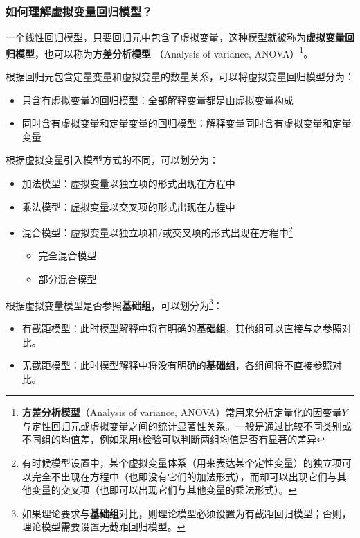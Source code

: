 \documentclass[12pt,(landscape,a4paper),(portrait,a4paper)]{article}
\providecommand{\tightlist}{%
  \setlength{\itemsep}{0pt}\setlength{\parskip}{0pt}}
\let\rmarkdownfootnote\footnote%
\def\footnote{\protect\rmarkdownfootnote}
\theoremstyle{definition}
\theoremstyle{definition}
\theoremstyle{definition}
\theoremstyle{remark}
\begin{document}
\subsubsection{如何理解虚拟变量回归模型？}

一个线性回归模型，只要回归元中包含了虚拟变量，这种模型就被称为\textbf{虚拟变量回归模型}，也可以称为\textbf{方差分析模型}
（Analysis of variance, ANOVA）\footnote{\textbf{方差分析模型}（Analysis
  of variance,
  ANOVA）常用来分析定量化的因变量\(Y\)与定性回归元或虚拟变量之间的统计显著性关系。一般是通过比较不同类别或不同组的均值差，例如采用t检验可以判断两组均值是否有显著的差异}。

根据回归元包含定量变量和虚拟变量的数量关系，可以将虚拟变量回归模型分为：

\begin{itemize}
\tightlist
\item
  只含有虚拟变量的回归模型：全部解释变量都是由虚拟变量构成
\item
  同时含有虚拟变量和定量变量的回归模型：解释变量同时含有虚拟变量和定量变量
\end{itemize}

根据虚拟变量引入模型方式的不同，可以划分为：

\begin{itemize}
\tightlist
\item
  加法模型：虚拟变量以独立项的形式出现在方程中
\item
  乘法模型：虚拟变量以交叉项的形式出现在方程中
\item
  混合模型：虚拟变量以独立项和/或交叉项的形式出现在方程中\footnote{有时候模型设置中，某个虚拟变量体系（用来表达某个定性变量）的独立项可以完全不出现在方程中（也即没有它们的加法形式），而却可以出现它们与其他变量的交叉项（也即可以出现它们与其他变量的乘法形式）。}

  \begin{itemize}
  \tightlist
  \item
    完全混合模型
  \item
    部分混合模型
  \end{itemize}
\end{itemize}

根据虚拟变量模型是否参照\textbf{基础组}，可以划分为\footnote{如果理论要求与\textbf{基础组}对比，则理论模型必须设置为有截距回归模型；否则，理论模型需要设置无截距回归模型。}：

\begin{itemize}
\tightlist
\item
  有截距模型：此时模型解释中将有明确的\textbf{基础组}，其他组可以直接与之参照对比。
\item
  无截距模型：此时模型解释中将没有明确的\textbf{基础组}，各组间将不直接参照对比。
\end{itemize}
\end{document}
